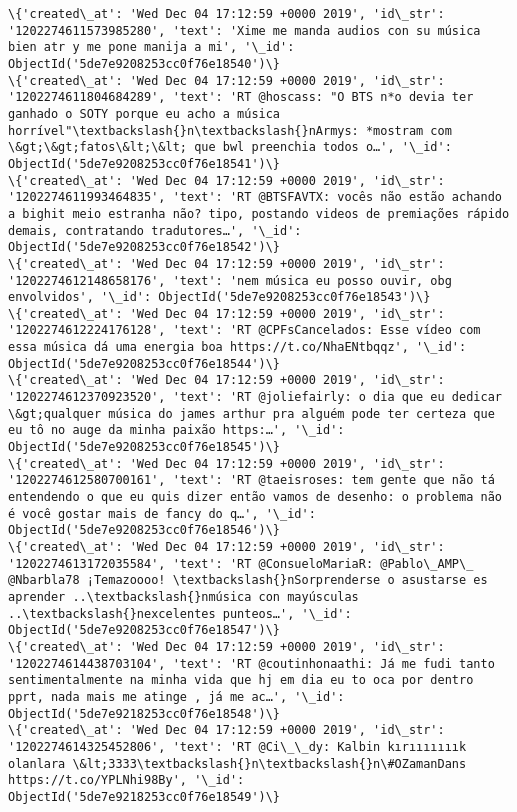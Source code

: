 \documentclass[11pt]{article}
\begin{document}
\begin{Verbatim}[commandchars=\\\{\}]
\{'created\_at': 'Wed Dec 04 17:12:59 +0000 2019', 'id\_str': '1202274611573985280', 'text': 'Xime me manda audios con su música bien atr y me pone manija a mi', '\_id': ObjectId('5de7e9208253cc0f76e18540')\}
\{'created\_at': 'Wed Dec 04 17:12:59 +0000 2019', 'id\_str': '1202274611804684289', 'text': 'RT @hoscass: "O BTS n*o devia ter ganhado o SOTY porque eu acho a música horrível"\textbackslash{}n\textbackslash{}nArmys: *mostram com \&gt;\&gt;fatos\&lt;\&lt; que bwl preenchia todos o…', '\_id': ObjectId('5de7e9208253cc0f76e18541')\}
\{'created\_at': 'Wed Dec 04 17:12:59 +0000 2019', 'id\_str': '1202274611993464835', 'text': 'RT @BTSFAVTX: vocês não estão achando a bighit meio estranha não? tipo, postando videos de premiações rápido demais, contratando tradutores…', '\_id': ObjectId('5de7e9208253cc0f76e18542')\}
\{'created\_at': 'Wed Dec 04 17:12:59 +0000 2019', 'id\_str': '1202274612148658176', 'text': 'nem música eu posso ouvir, obg envolvidos', '\_id': ObjectId('5de7e9208253cc0f76e18543')\}
\{'created\_at': 'Wed Dec 04 17:12:59 +0000 2019', 'id\_str': '1202274612224176128', 'text': 'RT @CPFsCancelados: Esse vídeo com essa música dá uma energia boa https://t.co/NhaENtbqqz', '\_id': ObjectId('5de7e9208253cc0f76e18544')\}
\{'created\_at': 'Wed Dec 04 17:12:59 +0000 2019', 'id\_str': '1202274612370923520', 'text': 'RT @joliefairly: o dia que eu dedicar \&gt;qualquer música do james arthur pra alguém pode ter certeza que eu tô no auge da minha paixão https:…', '\_id': ObjectId('5de7e9208253cc0f76e18545')\}
\{'created\_at': 'Wed Dec 04 17:12:59 +0000 2019', 'id\_str': '1202274612580700161', 'text': 'RT @taeisroses: tem gente que não tá entendendo o que eu quis dizer então vamos de desenho: o problema não é você gostar mais de fancy do q…', '\_id': ObjectId('5de7e9208253cc0f76e18546')\}
\{'created\_at': 'Wed Dec 04 17:12:59 +0000 2019', 'id\_str': '1202274613172035584', 'text': 'RT @ConsueloMariaR: @Pablo\_AMP\_ @Nbarbla78 ¡Temazoooo! \textbackslash{}nSorprenderse o asustarse es aprender ..\textbackslash{}nmúsica con mayúsculas ..\textbackslash{}nexcelentes punteos…', '\_id': ObjectId('5de7e9208253cc0f76e18547')\}
\{'created\_at': 'Wed Dec 04 17:12:59 +0000 2019', 'id\_str': '1202274614438703104', 'text': 'RT @coutinhonaathi: Já me fudi tanto sentimentalmente na minha vida que hj em dia eu to oca por dentro pprt, nada mais me atinge , já me ac…', '\_id': ObjectId('5de7e9218253cc0f76e18548')\}
\{'created\_at': 'Wed Dec 04 17:12:59 +0000 2019', 'id\_str': '1202274614325452806', 'text': 'RT @Ci\_\_dy: Kalbin kırııııııık olanlara \&lt;3333\textbackslash{}n\textbackslash{}n\#OZamanDans https://t.co/YPLNhi98By', '\_id': ObjectId('5de7e9218253cc0f76e18549')\}

\end{Verbatim}
\end{document}
